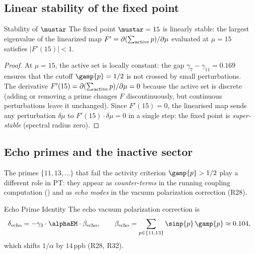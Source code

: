 \documentclass[12pt,a4paper]{article}
\begin{document}
\subsection{Linear stability of the fixed point}
\label{sec:ch8_stability}

\begin{thmbox}{Stability of $\mustar$}
\label{thm:stability}
The fixed point $\mustar = 15$ is linearly stable: the largest
eigenvalue of the linearized map $F' = \partial(\sum_{\rm active} p)/\partial\mu$
evaluated at $\mu = 15$ satisfies $|F'(15)| < 1$.

\begin{proof}
At $\mu = 15$, the active set is locally constant: the gap
$\gamma_7 - \gamma_{11} = 0.169$ ensures that the cutoff
$\gamp{p} = 1/2$ is not crossed by small perturbations.
The derivative $F'(15) = \partial(\sum_{\rm active} p)/\partial\mu = 0$
because the active set is discrete (adding or removing a prime
changes $F$ discontinuously, but continuous perturbations leave it
unchanged).  Since $F'(15) = 0$, the linearised map sends any
perturbation $\delta\mu$ to $F'(15)\cdot\delta\mu = 0$ in a single
step: the fixed point is \emph{super-stable} (spectral radius zero).
\end{proof}
\end{thmbox}

\subsection{Echo primes and the inactive sector}
\label{sec:ch8_ghost}

The primes $\{11, 13, \ldots\}$ that fail the activity criterion
$\gamp{p} > 1/2$ play a different role in PT: they appear as
\emph{counter-terms} in the running coupling computation (\cite{companion_physics})
and as \emph{echo modes} in the vacuum polarization correction (R28).

\begin{idbox}{Echo Prime Identity}
\label{id:ghost}
The echo vacuum polarization correction is
\begin{equation}
  \delta_{\rm echo} = -\gamma_3 \cdot \alphaEM \cdot \beta_{\rm echo},
  \qquad
  \beta_{\rm echo} = \sum_{p \in \{11,13\}} \sinp{p}\,\gamp{p}
  \approx 0.104,
  \label{eq:ghost_correction}
\end{equation}
which shifts $1/\alpha$ by $14\,\text{ppb}$ (R28, R32).
\end{idbox}
\end{document}
